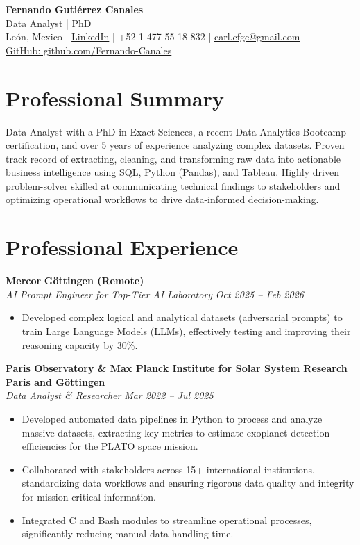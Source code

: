 \documentclass[10pt,a4paper]{article}
\begin{document}
\begin{center}
    {\Huge \textbf{Fernando Gutiérrez Canales}}\\
    {\Large Data Analyst | PhD}\\    
    León, Mexico \quad | \quad \href{https://www.linkedin.com/in/fernando-guti%C3%A9rrez-canales-804876343/}{LinkedIn} \quad | \quad +52 1 477 55 18 832 \quad | \quad \href{mailto:carl.cfgc@gmail.com}{carl.cfgc@gmail.com} \\
     \href{https://github.com/Fernando-Canales}{GitHub: github.com/Fernando-Canales}
\end{center}

\vspace{1em}

\section*{Professional Summary}
Data Analyst with a PhD in Exact Sciences, a recent Data Analytics Bootcamp certification, and over 5 years of experience analyzing complex datasets. Proven track record of extracting, cleaning, and transforming raw data into actionable business intelligence using SQL, Python (Pandas), and Tableau. Highly driven problem-solver skilled at communicating technical findings to stakeholders and optimizing operational workflows to drive data-informed decision-making.

\section*{Professional Experience}
\textbf{Mercor} \hfill \textbf{Göttingen (Remote)} \\
\textit{AI Prompt Engineer for Top-Tier AI Laboratory} \hfill \textit{Oct 2025 -- Feb 2026}
\begin{itemize}[leftmargin=1.5em]
	\item Developed complex logical and analytical datasets (adversarial prompts) to train Large Language Models (LLMs), effectively testing and improving their reasoning capacity by 30\%.
\end{itemize}

\textbf{Paris Observatory \& Max Planck Institute for Solar System Research} \hfill \textbf{Paris and Göttingen} \\
\textit{Data Analyst \& Researcher} \hfill \textit{Mar 2022 -- Jul 2025}
\begin{itemize}[leftmargin=1.5em]
    \item Developed automated data pipelines in Python to process and analyze massive datasets, extracting key metrics to estimate exoplanet detection efficiencies for the PLATO space mission.
    \item Collaborated with stakeholders across 15+ international institutions, standardizing data workflows and ensuring rigorous data quality and integrity for mission-critical information.
    \item Integrated C and Bash modules to streamline operational processes, significantly reducing manual data handling time.
\end{itemize}
\end{document}
